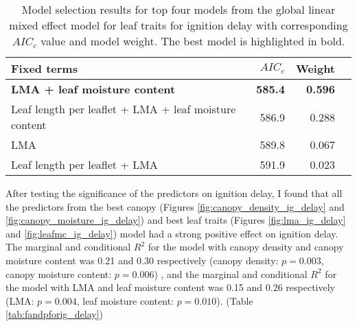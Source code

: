 \documentclass{ttuthes2007}
\begin{document}
\begin{table}
  \centering
  \caption{Model selection results for top four models from the global linear
    mixed effect model for leaf traits for ignition delay with corresponding
    $AIC_{c}$ value and model weight. The best model is highlighted in bold.}
  \begin{tabular}{lrrr}
    \toprule
    \textbf{Fixed terms} & $AIC_{c}$ & \textbf{Weight}\\
    \midrule
    \textbf{LMA + leaf moisture content}    & \textbf{585.4} & \textbf{0.596} \\
    Leaf length per leaflet + LMA + leaf moisture content & 586.9          & 0.288          \\
    LMA                                                   & 589.8          & 0.067          \\
    Leaf length per leaflet + LMA                         & 591.9          & 0.023          \\
    \bottomrule
  \end{tabular}
  \label{tab:leaf_models_ignition_delay}
\end{table}





\noindent After testing the significance of the predictors on ignition delay, I found that all the predictors from the best canopy (Figures \ref{fig:canopy_density_ig_delay} and \ref{fig:canopy_moisture_ig_delay}) and best leaf traits (Figures \ref{fig:lma_ig_delay} and \ref{fig:leafmc_ig_delay}) model had a strong positive effect on ignition delay. The marginal and conditional $R^2$ for the model with canopy density and canopy moisture content was 0.21 and 0.30 respectively (canopy density: $p = 0.003$, canopy moisture content: $p = 0.006$) , and the marginal and conditional $R^2$ for the model with LMA and leaf moisture content was 0.15 and 0.26 respectively (LMA: $p = 0.004$, leaf moisture content: $p = 0.010$). (Table \ref{tab:fandpforig_delay})
\end{document}
